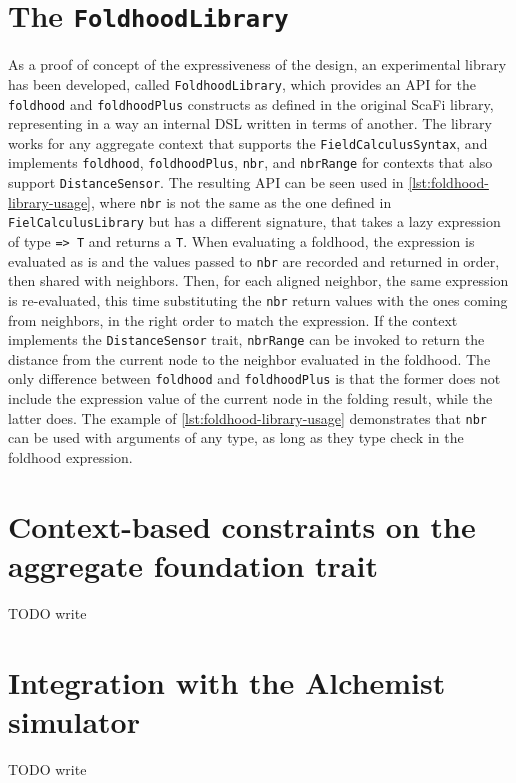 \section{The \texttt{FoldhoodLibrary}}

As a proof of concept of the expressiveness of the \this design, an experimental library has been developed, called \texttt{FoldhoodLibrary}, which provides an \ac{API} for the \texttt{foldhood} and \texttt{foldhoodPlus} constructs as defined in the original ScaFi library, representing in a way an internal \ac{DSL} written in terms of another.
%
The library works for any aggregate context that supports the \texttt{FieldCalculusSyntax}, and implements \texttt{foldhood}, \texttt{foldhoodPlus}, \texttt{nbr}, and \texttt{nbrRange} for contexts that also support \texttt{DistanceSensor}.
%
The resulting \ac{API} can be seen used in \cref{lst:foldhood-library-usage},
where \texttt{nbr} is not the same as the one defined in \texttt{FielCalculusLibrary} but has a different signature, that takes a lazy expression of type \texttt{=> T} and returns a \texttt{T}.
%
When evaluating a foldhood, the expression is evaluated as is and the values passed to \texttt{nbr} are recorded and returned in order, then shared with neighbors.
%
Then, for each aligned neighbor, the same expression is re-evaluated, this time substituting the \texttt{nbr} return values with the ones coming from neighbors, in the right order to match the expression.
%
If the context implements the \texttt{DistanceSensor} trait, \texttt{nbrRange} can be invoked to return the distance from the current node to the neighbor evaluated in the foldhood.
%
The only difference between \texttt{foldhood} and \texttt{foldhoodPlus} is that the former does not include the expression value of the current node in the folding result, while the latter does.
%
The example of \cref{lst:foldhood-library-usage} demonstrates that \texttt{nbr} can be used with arguments of any type, as long as they type check in the foldhood expression.



\section{Context-based constraints on the aggregate foundation trait}

TODO write

\section{Integration with the Alchemist simulator}

TODO write
